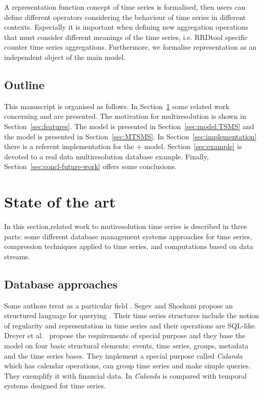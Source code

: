 A representation function concept of time series is formalised, then
users can define different operators considering the behaviour of time
series in different contexts. Especially it is important when defining
new aggregation operations that must consider different meanings of
the time series, i.e. RRDtool specific counter time series
aggregations. Furthermore, we formalise representation as an
independent object of the main model.




\subsection{Outline}

This manuscript is organised as follows.  In
Section~\ref{sec:related-work} some related work concerning
 and  are presented.  The motivation for
multiresolution is shown in Section~\ref{sec:features}.  The
 model is presented in Section~\ref{sec:model:TSMS} and the
 model is presented in Section~\ref{sec:MTSMS}.  In
Section~\ref{sec:implementation} there is a referent implementation
for the + model.  Section~\ref{sec:example} is
devoted to a real data multiresolution database example.  Finally,
Section~\ref{sec:concl-future-work} offers some conclusions.






\section{State of the art}
\label{sec:related-work}

In this section,related work to mutiresolution time series is
described in three parts: some different database management systems
approaches for time series, compression techniques applied to time
series, and computations based on data streams.




\subsection{Database approaches}

Some authors treat  as a particular  field
\cite{last01}.  Segev and Shoshani \cite{segev87:sigmod} propose an
structured language for querying . Their time series
structures include the notion of regularity and representation in time
series and their operations are SQL-like.  Dreyer et al.\
\cite{dreyer94} propose the requirements of special purpose  and
they base the model on four basic structural elements: events, time
series, groups, metadata and the time series bases. They implement a
special purpose \acro{TSMS} called \emph{Calanda} which has calendar
operations, can group time series and make simple queries. They
exemplify it with financial data. In \cite{schmidt95} \emph{Calanda}
is compared with temporal systems designed for time series.



